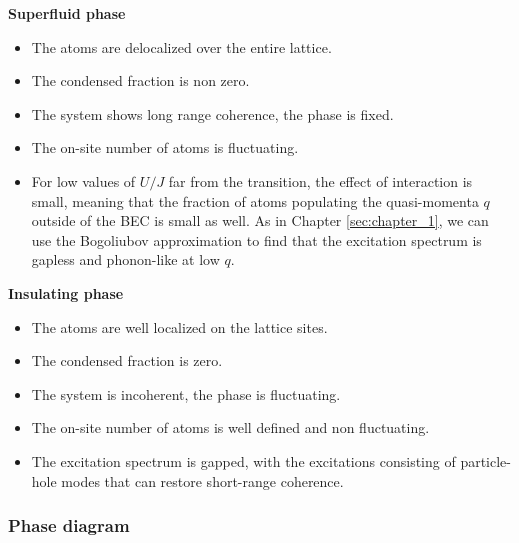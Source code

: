 \begin{minipage}[t]{0.45\textwidth}
    \noindent \textbf{Superfluid phase}
    \begin{itemize}
        \item The atoms are delocalized over the entire lattice.
        \item The condensed fraction is non zero.
        \item The system shows long range coherence, \ie the phase is fixed.
        \item The on-site number of atoms is fluctuating.
        \item For low values of $U/J$ far from the transition, the effect of interaction is small, meaning that the fraction of atoms populating the quasi-momenta $q$ outside of the BEC is small as well. As in Chapter \ref{sec:chapter_1}, we can use the Bogoliubov approximation to find that the excitation spectrum is gapless and phonon-like at low $q$.
    \end{itemize}
\end{minipage}
\begin{minipage}[t]{0.48\textwidth}
    \noindent \textbf{Insulating phase}
    \begin{itemize}
        \item The atoms are well localized on the lattice sites.
        \item The condensed fraction is zero.
        \item The system is incoherent, the phase is fluctuating.
        \item The on-site number of atoms is well defined and non fluctuating.
        \item The excitation spectrum is gapped, with the excitations consisting of particle-hole modes that can restore short-range coherence. 
    \end{itemize}
\end{minipage}

\subsubsection{Phase diagram}


